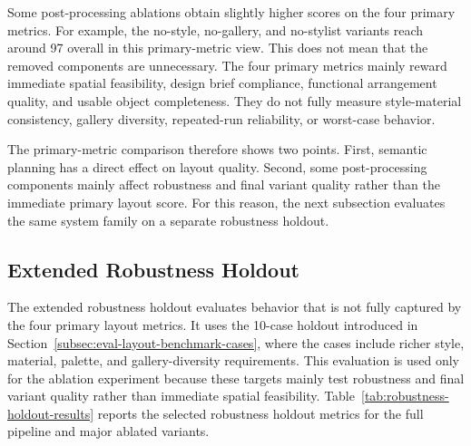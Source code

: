 Some post-processing ablations obtain slightly higher scores on the four primary metrics. For example, the no-style, no-gallery, and no-stylist variants reach around 97 overall in this primary-metric view. This does not mean that the removed components are unnecessary. The four primary metrics mainly reward immediate spatial feasibility, design brief compliance, functional arrangement quality, and usable object completeness. They do not fully measure style-material consistency, gallery diversity, repeated-run reliability, or worst-case behavior.

The primary-metric comparison therefore shows two points. First, semantic planning has a direct effect on layout quality. Second, some post-processing components mainly affect robustness and final variant quality rather than the immediate primary layout score. For this reason, the next subsection evaluates the same system family on a separate robustness holdout.

\subsection{Extended Robustness Holdout}

The extended robustness holdout evaluates behavior that is not fully captured by the four primary layout metrics. It uses the 10-case holdout introduced in Section~\ref{subsec:eval-layout-benchmark-cases}, where the cases include richer style, material, palette, and gallery-diversity requirements. This evaluation is used only for the ablation experiment because these targets mainly test robustness and final variant quality rather than immediate spatial feasibility. Table~\ref{tab:robustness-holdout-results} reports the selected robustness holdout metrics for the full pipeline and major ablated variants.

